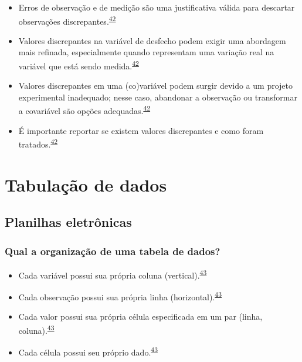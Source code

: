 \documentclass[
]{book}
\begin{document}
\begin{itemize}
\item
  Erros de observação e de medição são uma justificativa válida para descartar observações discrepantes.\textsuperscript{\protect\hyperlink{ref-zuur2009}{42}}
\item
  Valores discrepantes na variável de desfecho podem exigir uma abordagem mais refinada, especialmente quando representam uma variação real na variável que está sendo medida.\textsuperscript{\protect\hyperlink{ref-zuur2009}{42}}
\item
  Valores discrepantes em uma (co)variável podem surgir devido a um projeto experimental inadequado; nesse caso, abandonar a observação ou transformar a covariável são opções adequadas.\textsuperscript{\protect\hyperlink{ref-zuur2009}{42}}
\item
  É importante reportar se existem valores discrepantes e como foram tratados.\textsuperscript{\protect\hyperlink{ref-zuur2009}{42}}
\end{itemize}

\hypertarget{tabulacao-dados}{%
\chapter{\texorpdfstring{\textbf{Tabulação de dados}}{Tabulação de dados}}\label{tabulacao-dados}}

\hypertarget{planilhas}{%
\section{Planilhas eletrônicas}\label{planilhas}}

\hypertarget{qual-a-organizauxe7uxe3o-de-uma-tabela-de-dados}{%
\subsection{Qual a organização de uma tabela de dados?}\label{qual-a-organizauxe7uxe3o-de-uma-tabela-de-dados}}

\begin{itemize}
\item
  Cada variável possui sua própria coluna (vertical).\textsuperscript{\protect\hyperlink{ref-tierney2023}{43}}
\item
  Cada observação possui sua própria linha (horizontal).\textsuperscript{\protect\hyperlink{ref-tierney2023}{43}}
\item
  Cada valor possui sua própria célula especificada em um par (linha, coluna).\textsuperscript{\protect\hyperlink{ref-tierney2023}{43}}
\item
  Cada célula possui seu próprio dado.\textsuperscript{\protect\hyperlink{ref-tierney2023}{43}}
\end{itemize}
\end{document}
